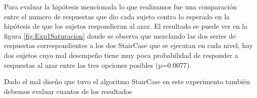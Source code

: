 \documentclass{article}
\begin{document}
    Para evaluar la hipótesis mencionada lo que realizamos fue una comparación entre el numero de respuestas que dio cada sujeto contra lo esperado en la hipótesis de que los sujetos respondieran al azar. El resultado se puede ver en la figura \ref{fig:Exp1Saturacion} donde se observa que mezclando las dos series de respuestas correspondientes a los dos StairCase que se ejecutan en cada nivel, hay dos sujetos cuyo mal desempeño tiene muy poca probabilidad de responder a respuestas al azar entre las tres opciones posibles (p=0.0077).
    
    Dado el mal diseño que tuvo el algoritmo StairCase en este experimento también debemos evaluar cuantos de los resultados 
    
		
    
\clearpage


\begin{thebibliography}{9}


\end{thebibliography}
\end{document}

